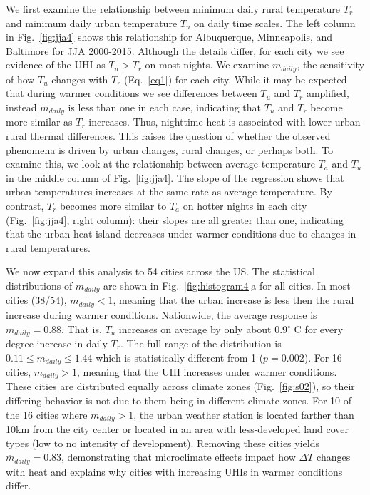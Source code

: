 {We first examine the relationship between minimum daily rural temperature $T_{r}$ and minimum daily urban temperature $T_u$ on daily time scales. The left column in Fig.~\ref{fig:jja4} shows this relationship for Albuquerque, Minneapolis, and Baltimore for JJA 2000-2015. Although the details differ, for each city we see evidence of the UHI as $T_u > T_r$ on most nights. We examine $m_{daily}$, the sensitivity of how $T_u$ changes with $T_r$ (Eq.~\ref{eq1}) for each city. While it may be expected that during warmer conditions we see differences between $T_u$ and $T_r$ amplified, instead $m_{daily}$ is less than one in each case, indicating that $T_u$ and $T_r$ become more similar as $T_r$ increases. Thus, nighttime heat is associated with lower urban-rural thermal differences. 
This raises the question of whether the observed phenomena is driven by urban changes, rural changes, or perhaps both. To examine this, we look at the relationship between average temperature $T_{a}$ and $T_u$ in the middle column of Fig.~\ref{fig:jja4}. The slope of the regression shows that urban temperatures increases at the same rate as average temperature. By contrast, $T_r$ becomes more similar to $T_{a}$ on hotter nights in each city (Fig.~\ref{fig:jja4}, right column): their slopes are all greater than one, indicating that the urban heat island decreases under warmer conditions due to changes in rural temperatures.

We now expand this analysis to 54 cities across the US. The statistical distributions of $m_{daily}$ %
are shown in  Fig.~\ref{fig:histogram4}a for all cities. In most cities (38/54), $m_{daily}< 1$, meaning that the urban increase is less then the rural increase during warmer conditions.  Nationwide, the average response is $\overline{m}_{daily} = 0.88$. 
 That is, $T_u$ increases on average by only about 0.9$^\circ$ C for every degree increase in daily $T_r$. 
The full range of the distribution is $0.11 \leq m_{daily} \leq 1.44 $ which is statistically different from 1 ($p =0.002 $).
For 16 cities, $m_{daily} >1$, meaning that the UHI increases under warmer conditions. These cities are distributed equally across climate zones (Fig.~\ref{fig:s02}), so their differing behavior is not due to them being in different climate zones. 
For 10 of the 16 cities where $m_{daily} >1$, the urban weather station is located farther than 10km from the city center or located in an area with less-developed land cover types (low to no intensity of development). Removing these cities yields $\overline{m}_{daily} = 0.83$, demonstrating that microclimate effects impact how $\Delta T$ changes with heat and explains why cities with increasing UHIs in warmer conditions differ. 

}
